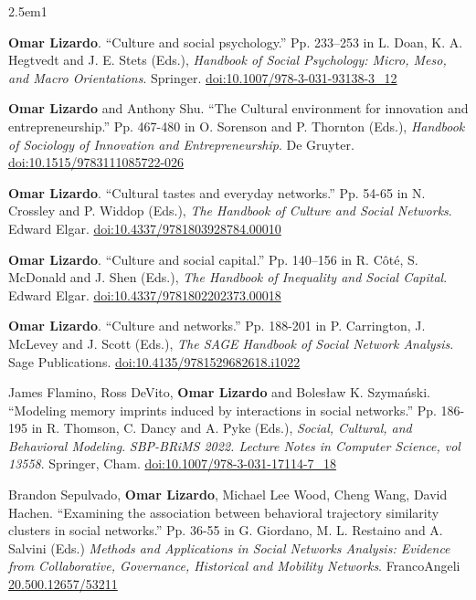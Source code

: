 \documentclass[
]{article}
\newenvironment{cventry}{\begin{hangparas}{2.5em}{1}}{\end{hangparas}}
\begin{document}
\begin{cventry}

\textbf{Omar Lizardo}. ``Culture and social psychology.'' Pp. 233--253
in L. Doan, K. A. Hegtvedt and J. E. Stets (Eds.), \emph{Handbook of
Social Psychology: Micro, Meso, and Macro Orientations}. Springer.
\href{https://doi.org/10.1007/978-3-031-93138-3_12}{doi:10.1007/978-3-031-93138-3\_12}

\textbf{Omar Lizardo} and Anthony Shu. ``The Cultural environment for
innovation and entrepreneurship.'' Pp. 467-480 in O. Sorenson and P.
Thornton (Eds.), \emph{Handbook of Sociology of Innovation and
Entrepreneurship}. De Gruyter.
\href{https://doi.org/10.1515/9783111085722-026}{doi:10.1515/9783111085722-026}

\textbf{Omar Lizardo}. ``Cultural tastes and everyday networks.'' Pp.
54-65 in N. Crossley and P. Widdop (Eds.), \emph{The Handbook of Culture
and Social Networks}. Edward Elgar.
\href{https://doi.org/10.4337/9781803928784.00010}{doi:10.4337/9781803928784.00010}

\textbf{Omar Lizardo}. ``Culture and social capital.'' Pp. 140--156 in
R. Côté, S. McDonald and J. Shen (Eds.), \emph{The Handbook of
Inequality and Social Capital}. Edward Elgar.
\href{https://doi.org/10.4337/9781802202373.00018}{doi:10.4337/9781802202373.00018}

\textbf{Omar Lizardo}. ``Culture and networks.'' Pp. 188-201 in P.
Carrington, J. McLevey and J. Scott (Eds.), \emph{The SAGE Handbook of
Social Network Analysis}. Sage Publications.
\href{https://doi.org/10.4135/9781529682618.i1022}{doi:10.4135/9781529682618.i1022}

James Flamino, Ross DeVito, \textbf{Omar Lizardo} and Bolesław K.
Szymański. ``Modeling memory imprints induced by interactions in social
networks.'' Pp. 186-195 in R. Thomson, C. Dancy and A. Pyke (Eds.),
\emph{Social, Cultural, and Behavioral Modeling}. \emph{SBP-BRiMS 2022.
Lecture Notes in Computer Science, vol 13558}. Springer, Cham.
\href{https://doi.org/10.1007/978-3-031-17114-7_18}{doi:10.1007/978-3-031-17114-7\_18}

Brandon Sepulvado, \textbf{Omar Lizardo}, Michael Lee Wood, Cheng Wang,
David Hachen. ``Examining the association between behavioral trajectory
similarity clusters in social networks.'' Pp. 36-55 in G. Giordano, M.
L. Restaino and A. Salvini (Eds.) \emph{Methods and Applications in
Social Networks Analysis: Evidence from Collaborative, Governance,
Historical and Mobility Networks}. FrancoAngeli
\href{https://library.oapen.org/handle/20.500.12657/53211}{20.500.12657/53211}


\end{cventry}
\end{document}
